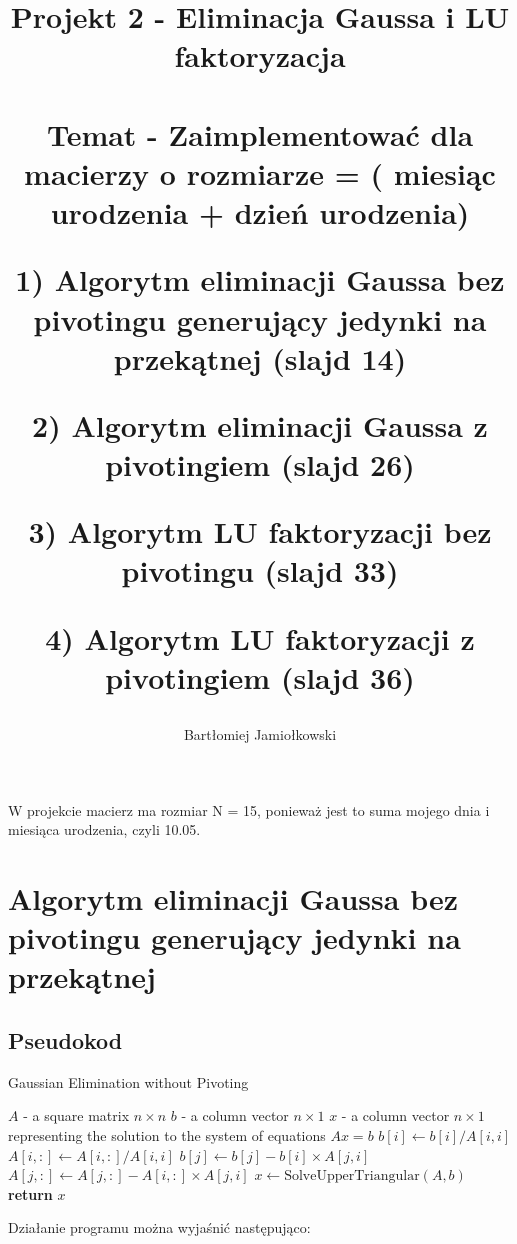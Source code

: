 \documentclass[9pt]{article}
\title{
    \huge \textbf{Projekt 2 - Eliminacja Gaussa i LU faktoryzacja}\\~\\
    \LARGE Temat - Zaimplementować dla macierzy o rozmiarze = (
    miesiąc urodzenia + dzień urodzenia)
    
    1) Algorytm eliminacji Gaussa bez pivotingu generujący jedynki na przekątnej (slajd 14)
    
    2) Algorytm eliminacji Gaussa z pivotingiem (slajd 26)
    
    3) Algorytm LU faktoryzacji bez pivotingu (slajd 33)
    
    4) Algorytm LU faktoryzacji z pivotingiem (slajd 36)
}
\author{Bartłomiej Jamiołkowski}
\date{}
\begin{document}
\maketitle

W projekcie macierz ma rozmiar N = 15, ponieważ jest to suma mojego dnia i miesiąca urodzenia, czyli 10.05.

\section{Algorytm eliminacji Gaussa bez pivotingu generujący jedynki na
przekątnej}

\subsection{Pseudokod}

\begin{algorithm}
\caption{Gaussian Elimination without Pivoting}
\begin{algorithmic}[1]
\Require $A$ - a square matrix $n \times n$
\Require $b$ - a column vector $n \times 1$
\Ensure $x$ - a column vector $n \times 1$ representing the solution to the system of equations $Ax = b$
            \State $b[i] \gets b[i] / A[i, i]$
            \State $A[i, :] \gets A[i, :] / A[i, i]$
            \State $b[j] \gets b[j] - b[i] \times A[j, i]$
            \State $A[j, :] \gets A[j, :] - A[i, :] \times A[j, i]$
        \EndIf
    \EndFor
\EndFor
\State $x \gets \text{SolveUpperTriangular}(A, b)$ 
\State \textbf{return} $x$
\end{algorithmic}
\end{algorithm}
\newpage

Działanie programu można wyjaśnić następująco:
\end{document}
